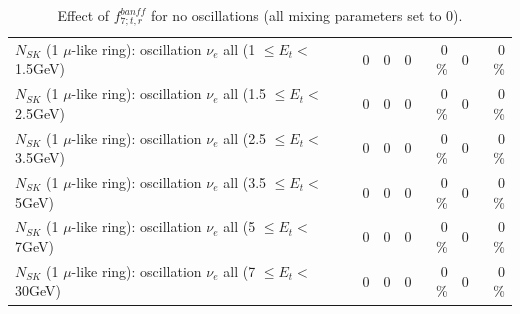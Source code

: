 \begin{table}
\begin{tabular}{| l | r | r | r  r | r  r |}
$N_{SK}$ (1 $\mu$-like ring): oscillation $\nu_{e}$ all (1 $\leq E_{t} <$ 1.5GeV) &               0 &               0 &               0 &        0 \%  &               0 &        0 \%  \\ 
$N_{SK}$ (1 $\mu$-like ring): oscillation $\nu_{e}$ all (1.5 $\leq E_{t} <$ 2.5GeV) &               0 &               0 &               0 &        0 \%  &               0 &        0 \%  \\ 
$N_{SK}$ (1 $\mu$-like ring): oscillation $\nu_{e}$ all (2.5 $\leq E_{t} <$ 3.5GeV) &               0 &               0 &               0 &        0 \%  &               0 &        0 \%  \\ 
$N_{SK}$ (1 $\mu$-like ring): oscillation $\nu_{e}$ all (3.5 $\leq E_{t} <$ 5GeV) &               0 &               0 &               0 &        0 \%  &               0 &        0 \%  \\ 
 $N_{SK}$ (1 $\mu$-like ring): oscillation $\nu_{e}$ all (5 $\leq E_{t} <$ 7GeV) &               0 &               0 &               0 &        0 \%  &               0 &        0 \%  \\ 
$N_{SK}$ (1 $\mu$-like ring): oscillation $\nu_{e}$ all (7 $\leq E_{t} <$ 30GeV) &               0 &               0 &               0 &        0 \%  &               0 &        0 \%  \\ 
\hline
\hline
\end{tabular}
\caption{ Effect of $f_{7; t, r}^{banff}$ for no oscillations (all mixing parameters set to 0). }
\label{tab:num_banff_07_1RmuT_3f_osc_t13:0}
\end{table}
\clearpage
